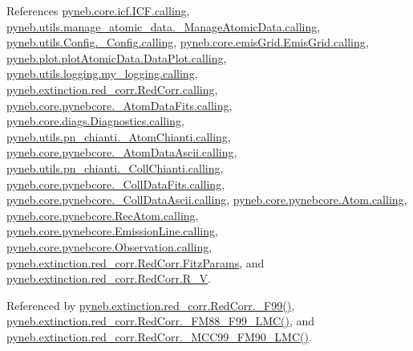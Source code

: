 \begin{DoxyVerb}
References \hyperlink{icf_8py_source_l00016}{pyneb.\+core.\+icf.\+I\+C\+F.\+calling}, \hyperlink{manage__atomic__data_8py_source_l00018}{pyneb.\+utils.\+manage\+\_\+atomic\+\_\+data.\+\_\+\+Manage\+Atomic\+Data.\+calling}, \hyperlink{_config_8py_source_l00032}{pyneb.\+utils.\+Config.\+\_\+\+Config.\+calling}, \hyperlink{emis_grid_8py_source_l00041}{pyneb.\+core.\+emis\+Grid.\+Emis\+Grid.\+calling}, \hyperlink{plot_atomic_data_8py_source_l00042}{pyneb.\+plot.\+plot\+Atomic\+Data.\+Data\+Plot.\+calling}, \hyperlink{logging_8py_source_l00044}{pyneb.\+utils.\+logging.\+my\+\_\+logging.\+calling}, \hyperlink{red__corr_8py_source_l00059}{pyneb.\+extinction.\+red\+\_\+corr.\+Red\+Corr.\+calling}, \hyperlink{pynebcore_8py_source_l00090}{pyneb.\+core.\+pynebcore.\+\_\+\+Atom\+Data\+Fits.\+calling}, \hyperlink{diags_8py_source_l00169}{pyneb.\+core.\+diags.\+Diagnostics.\+calling}, \hyperlink{pn__chianti_8py_source_l00223}{pyneb.\+utils.\+pn\+\_\+chianti.\+\_\+\+Atom\+Chianti.\+calling}, \hyperlink{pynebcore_8py_source_l00311}{pyneb.\+core.\+pynebcore.\+\_\+\+Atom\+Data\+Ascii.\+calling}, \hyperlink{pn__chianti_8py_source_l00414}{pyneb.\+utils.\+pn\+\_\+chianti.\+\_\+\+Coll\+Chianti.\+calling}, \hyperlink{pynebcore_8py_source_l00568}{pyneb.\+core.\+pynebcore.\+\_\+\+Coll\+Data\+Fits.\+calling}, \hyperlink{pynebcore_8py_source_l00918}{pyneb.\+core.\+pynebcore.\+\_\+\+Coll\+Data\+Ascii.\+calling}, \hyperlink{pynebcore_8py_source_l01175}{pyneb.\+core.\+pynebcore.\+Atom.\+calling}, \hyperlink{pynebcore_8py_source_l02572}{pyneb.\+core.\+pynebcore.\+Rec\+Atom.\+calling}, \hyperlink{pynebcore_8py_source_l03263}{pyneb.\+core.\+pynebcore.\+Emission\+Line.\+calling}, \hyperlink{pynebcore_8py_source_l03419}{pyneb.\+core.\+pynebcore.\+Observation.\+calling}, \hyperlink{red__corr_8py_source_l00078}{pyneb.\+extinction.\+red\+\_\+corr.\+Red\+Corr.\+Fitz\+Params}, and \hyperlink{red__corr_8py_source_l00204}{pyneb.\+extinction.\+red\+\_\+corr.\+Red\+Corr.\+R\+\_\+\+V}.



Referenced by \hyperlink{red__corr_8py_source_l00822}{pyneb.\+extinction.\+red\+\_\+corr.\+Red\+Corr.\+\_\+\+F99()}, \hyperlink{red__corr_8py_source_l00851}{pyneb.\+extinction.\+red\+\_\+corr.\+Red\+Corr.\+\_\+\+F\+M88\+\_\+\+F99\+\_\+\+L\+M\+C()}, and \hyperlink{red__corr_8py_source_l00789}{pyneb.\+extinction.\+red\+\_\+corr.\+Red\+Corr.\+\_\+\+M\+C\+C99\+\_\+\+F\+M90\+\_\+\+L\+M\+C()}.



\end{DoxyVerb}
